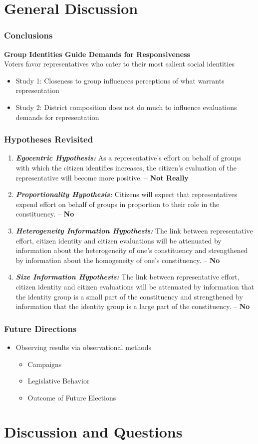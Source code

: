 \documentclass[14pt]{beamer}
\newcommand\e{\emph}
\newcommand\tb{\textbf}
\begin{document}
\section{General Discussion}
\begin{frame}
\frametitle{Conclusions}
\begin{center}
	\large
	\tb{Group Identities Guide Demands for Responsiveness} \\
	\smallskip
	\normalsize 
	Voters favor representatives who cater to their most salient social identities
\end{center}
\begin{itemize}
	\small
	\item Study 1: Closeness to group influences perceptions of what warrants representation 
	\item Study 2: District composition does not do much to influence evaluations demands for representation
\end{itemize}
\end{frame}

\begin{frame}
\footnotesize
\frametitle{Hypotheses Revisited}
\begin{enumerate}
	\item \tb{\e{Egocentric Hypothesis:}} As a representative's effort on behalf of groups with which the citizen identifies increases, the citizen's evaluation of the representative will become more positive. -- \tb{Not Really}
	\item \tb{\e{Proportionality Hypothesis:}} Citizens will expect that representatives expend effort on behalf of groups in proportion to their role in the constituency. -- \tb{No}
	\item \tb{\e{Heterogeneity Information Hypothesis:}} The link between representative effort, citizen identity and citizen evaluations will be attenuated by information about the heterogeneity of one’s constituency and strengthened by information about the homogeneity of one’s constituency. -- \tb{No}
	\item \tb{\e{Size Information Hypothesis:}} The link between representative effort, citizen identity and citizen evaluations will be attenuated by information that the identity group is a small part of the constituency and strengthened by information that the identity group is a large part of the constituency. -- \tb{No}
\end{enumerate}
\end{frame}

\begin{frame}
\frametitle{Future Directions}
\begin{itemize}
	\item Observing results via observational methods 
	\begin{itemize}
		\item Campaigns
		\item Legislative Behavior
		\item Outcome of Future Elections
	\end{itemize}
\end{itemize}
\end{frame}

\section{Discussion and Questions}
\end{document}
